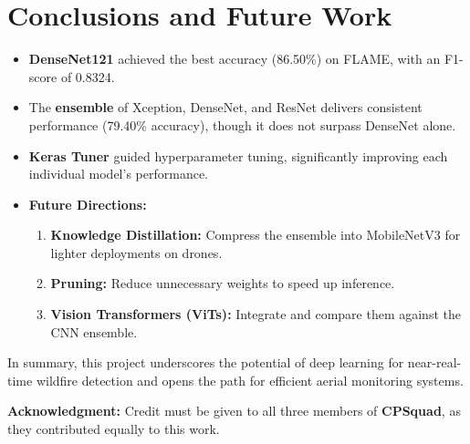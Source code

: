 \section{Conclusions and Future Work}
\label{sec:conclusions}

\begin{itemize}
    \item \textbf{DenseNet121} achieved the best accuracy (86.50\%) on FLAME, with an
    F1-score of 0.8324.
    \item The \textbf{ensemble} of Xception, DenseNet, and ResNet delivers consistent
    performance (79.40\% accuracy), though it does not surpass DenseNet alone.
    \item \textbf{Keras Tuner} guided hyperparameter tuning, significantly improving
    each individual model's performance.
    \item \textbf{Future Directions:}
      \begin{enumerate}
        \item \textbf{Knowledge Distillation:} Compress the ensemble into MobileNetV3
        for lighter deployments on drones.
        \item \textbf{Pruning:} Reduce unnecessary weights to speed up inference.
        \item \textbf{Vision Transformers (ViTs):} Integrate and compare them against
        the CNN ensemble.
      \end{enumerate}
\end{itemize}

In summary, this project underscores the potential of deep learning for near-real-time
wildfire detection and opens the path for efficient aerial monitoring systems.

\textbf{Acknowledgment:} Credit must be given to all three members of \textbf{CPSquad},
as they contributed equally to this work.
